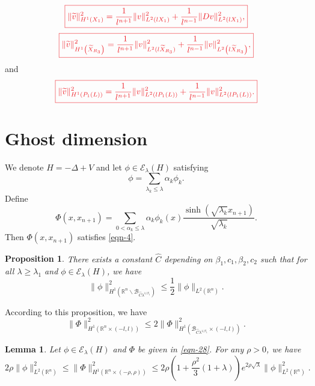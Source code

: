 \documentclass[12pt]{amsart}
\newcommand\R{\ensuremath{\mathbb{R}}}
\newtheorem{proposition}[theorem]{Proposition}
\newtheorem{lemma}[theorem]{Lemma}
\theoremstyle{definition}
\newcommand{\makeredbox}[1]{\textcolor{Red}{\boxed{#1}}}
\begin{document}
\begin{equation}\label{term-4}
	\makeredbox{\|\widetilde{v}\|_{H^{1}(X_1)}^2=\frac{1}{l^{n+1}}\|v\|^2_{L^2(lX_1)}+\frac{1}{l^{n-1}}\|Dv\|^2_{L^2(lX_1)},}
\end{equation}
\begin{equation}
	\makeredbox{\|\widetilde{v}\|^2_{H^{1}\left( \widetilde{X}_{R_3} \right) }= \frac{1}{l^{n+1}}\|v\|^2_{L^2(l\widetilde{X}_{R_3})}+\frac{1}{l^{n-1}}\|v\|^2_{L^2\left( l\widetilde{X}_{R_3} \right) },}
\end{equation}
and
\begin{equation}
	\makeredbox{\|\widetilde{v}\|^2_{H^{1}\left( P_1(L) \right) }=\frac{1}{l^{n+1}}\|v\|^2_{L^2(lP_1(L))}+\frac{1}{l^{n-1}}\|v\|^2_{L^2\left( lP_1(L) \right) }.}
\end{equation}

\section{Ghost dimension}
We denote $H=-\Delta+V$ and let $\phi \in \mathcal{E}_\lambda(H) $ satisfying
\begin{equation}
	\phi=\sum_{\lambda_k\le \lambda} \alpha _k\phi_k.
\end{equation}
Define
\begin{equation}\label{eqn-28}
	\Phi(x,x_{n+1})=\sum_{0<\alpha _k\le \lambda} \alpha _k \phi_k(x) \frac{\sinh \left( \sqrt{\lambda_k} x_{n+1} \right) }{\sqrt{\lambda_k} }.
\end{equation}
Then $\Phi(x,x_{n+1})$ satisfies \eqref{eqn-4}.

\begin{proposition}\label{prop-3}
	There exists a constant $\widehat{C}$ depending on $\beta_1,c_1,\beta_2,c_2$ such that for all $\lambda\ge \lambda_1$ and $\phi \in \mathcal{E}_\lambda(H) $, we have
	\begin{equation}
		\|\phi\|^2_{H^{1}\left( \R^{n}\backslash \mathcal{B}_{\widehat{C}\lambda^{1 /\beta_1}} \right) }\le \frac{1}{2}\|\phi\|_{L^2(\R^{n})}.
	\end{equation}
\end{proposition}
According to this proposition, we have
\begin{equation}\label{eqn-30}
	\|\Phi\|^2_{H^{1}\left( \R^{n}\times (-l,l) \right) }\le 2 \|\Phi\|^2_{H^{1}\left( \mathcal{B}_{\widehat{C}\lambda^{1 /\beta_1}} \times (-l,l)\right) }.
\end{equation}

\begin{lemma}\label{lma-4}
	Let $\phi \in \mathcal{E}_\lambda(H) $ and $\Phi$ be given in \eqref{eqn-28}. For any $\rho >0$, we have 
	\begin{equation}
		2\rho \|\phi\|^2_{L^2\left( \R^{n} \right) }\le \|\Phi\|^2_{H^{1}\left( \R^{n}\times (-\rho,\rho ) \right) }\le 2\rho \left( 1+\frac{\rho ^2}{3}(1+\lambda) \right) e^{2\rho \sqrt{\lambda} }\|\phi\|^2_{L^2(\R^{n})}.
	\end{equation}
\end{lemma}
\end{document}

